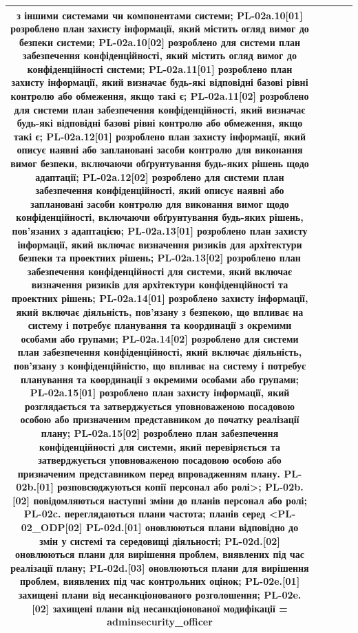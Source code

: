 \documentclass[10pt]{article}
\begin{document}
\begin{longtable}{|c|>{\raggedright\arraybackslash}p{4cm}|>{\raggedright\arraybackslash}p{2.5cm}|>{\raggedright\arraybackslash}p{3.5cm}|>{\raggedright\arraybackslash}p{5.5cm}|}
з іншими системами чи компонентами системи; PL-02a.10[01] розроблено план захисту інформації, який містить огляд вимог до безпеки системи; PL-02a.10[02] розроблено для системи план забезпечення конфіденційності, який містить огляд вимог до конфіденційності системи; PL-02a.11[01] розроблено план захисту інформації, який визначає будь-які відповідні базові рівні контролю або обмеження, якщо такі є; PL-02a.11[02] розроблено для системи план забезпечення конфіденційності, який визначає будь-які відповідні базові рівні контролю або обмеження, якщо такі є; PL-02a.12[01] розроблено план захисту інформації, який описує наявні або заплановані засоби контролю для виконання вимог безпеки, включаючи обґрунтування будь-яких рішень щодо адаптації; PL-02a.12[02] розроблено для системи план забезпечення конфіденційності, який описує наявні або заплановані засоби контролю для виконання вимог щодо конфіденційності, включаючи обґрунтування будь-яких рішень, пов'язаних з адаптацією; PL-02a.13[01] розроблено план захисту інформації, який включає визначення ризиків для архітектури безпеки та проектних рішень; PL-02a.13[02] розроблено план забезпечення конфіденційності для системи, який включає визначення ризиків для архітектури конфіденційності та проектних рішень; PL-02a.14[01] розроблено захисту інформації, який включає діяльність, пов'язану з безпекою, що впливає на систему і потребує планування та координації з окремими особами або групами; PL-02a.14[02] розроблено для системи план забезпечення конфіденційності, який включає діяльність, пов'язану з конфіденційністю, що впливає на систему і потребує планування та координації з окремими особами або групами; PL-02a.15[01] розроблено план захисту інформації, який розглядається та затверджується уповноваженою посадовою особою або призначеним представником до початку реалізації плану; PL-02a.15[02] розроблено план забезпечення конфіденційності для системи, який перевіряється та затверджується уповноваженою посадовою особою або призначеним представником перед впровадженням плану. PL-02b.[01] розповсюджуються копії персонал або ролі>; PL-02b.[02] повідомляються наступні зміни до планів персонал або ролі; PL-02c. переглядаються плани частота; планів серед <PL-02\_\allowbreak{}ODP[02] PL-02d.[01] оновлюються плани відповідно до змін у системі та середовищі діяльності; PL-02d.[02] оновлюються плани для вирішення проблем, виявлених під час реалізації плану; PL-02d.[03] оновлюються плани для вирішення проблем, виявлених під час контрольних оцінок; PL-02e.[01] захищені плани від несанкціонованого розголошення; PL-02e.[02] захищені плани від несанкціонованої модифікації = \textbf{adminsecurity\_\allowbreak{}officer} \\ \hline

\end{longtable}
\end{document}
